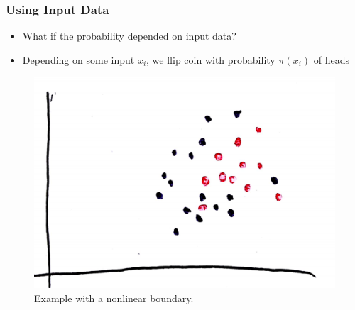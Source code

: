\documentclass[10pt,mathserif]{beamer}
\begin{document}
\begin{frame}
  \frametitle{Using Input Data}
  \begin{itemize}
  \item What if the probability depended on input data?
  \item Depending on some input $x_i$, we flip coin with probability
    $\pi\left(x_i\right)$ of heads
  \end{itemize}
  \begin{figure}
    \centering
    \includegraphics[width=0.3\paperwidth]{figure/logistic_scatter_nonlinear_points}
    \caption{Example with a nonlinear
      boundary. \label{fig:logistic_nonlinear_scatter_points} }
  \end{figure}
\end{frame}
\end{document}
